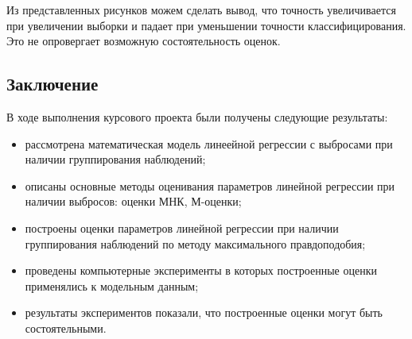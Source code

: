\documentclass[a4paper,14pt]{extarticle}
\begin{document}
Из представленных рисунков можем сделать вывод, что точность увеличивается при увеличении выборки и падает при уменьшении
точности классифицирования. Это не опровергает возможную состоятельность оценок.\hfill\break
\newpage

\begin{center}
    \section*{Заключение}
\end{center}
{}
В ходе выполнения курсового проекта были получены следующие результаты:
\begin{itemize}
    \item рассмотрена математическая модель линеейной регрессии с выбросами при наличии группирования наблюдений;
    \item описаны основные методы оценивания параметров линейной регрессии при наличии выбросов: оценки МНК, М-оценки;
    \item построены оценки параметров линейной регрессии при наличии группирования наблюдений по методу максимального правдоподобия;
    \item проведены компьютерные эксперименты в которых построенные оценки применялись к модельным данным;
    \item результаты экспериментов показали, что построенные оценки могут быть состоятельными.
\end{itemize}
\end{document}
